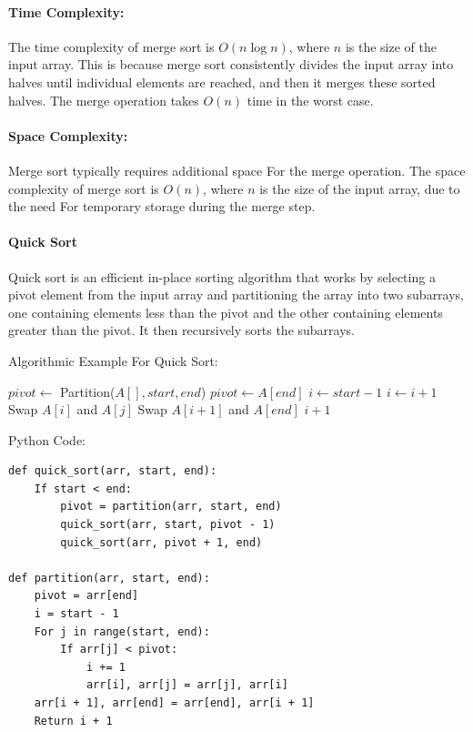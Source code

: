 \documentclass[12pt]{book} %
\begin{document}
\paragraph{Time Complexity:}
The time complexity of merge sort is \(O(n \log n)\), where \(n\) is the size of the input array. This is because merge sort consistently divides the input array into halves until individual elements are reached, and then it merges these sorted halves. The merge operation takes \(O(n)\) time in the worst case.

\paragraph{Space Complexity:}
Merge sort typically requires additional space For the merge operation. The space complexity of merge sort is \(O(n)\), where \(n\) is the size of the input array, due to the need For temporary storage during the merge step.

\paragraph{Quick Sort}

Quick sort is an efficient in-place sorting algorithm that works by selecting a pivot element from the input array and partitioning the array into two subarrays, one containing elements less than the pivot and the other containing elements greater than the pivot. It then recursively sorts the subarrays.


Algorithmic Example For Quick Sort:
     \FloatBarrier %
    \begin{algorithm}
\caption{Quick Sort}
\begin{algorithmic}[1]
        \State $pivot \gets$ Partition($A[], start, end$)
        \State {}
        \State {}
    \EndIf
\EndFunction
\FloatBarrier %
    \State $pivot \gets A[end]$
    \State $i \gets start - 1$
            \State $i \gets i + 1$
            \State Swap $A[i]$ and $A[j]$
        \EndIf
    \EndFor
    \State Swap $A[i + 1]$ and $A[end]$
    \State \Return $i + 1$
\EndFunction
\end{algorithmic}
\end{algorithm}
\FloatBarrier %
Python Code:
\begin{verbatim}
def quick_sort(arr, start, end):
    If start < end:
        pivot = partition(arr, start, end)
        quick_sort(arr, start, pivot - 1)
        quick_sort(arr, pivot + 1, end)

def partition(arr, start, end):
    pivot = arr[end]
    i = start - 1
    For j in range(start, end):
        If arr[j] < pivot:
            i += 1
            arr[i], arr[j] = arr[j], arr[i]
    arr[i + 1], arr[end] = arr[end], arr[i + 1]
    Return i + 1
\end{verbatim}
    \FloatBarrier %
\end{document}
